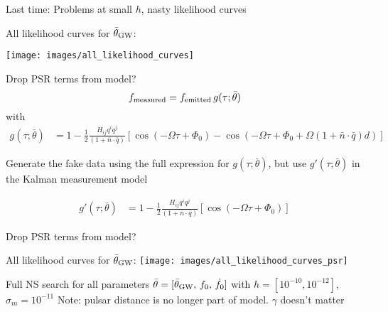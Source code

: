 \documentclass[10pt]{beamer}
\title{}
\subtitle{}
\author{}
\date{EE/GW meeting, May 19, 2023}
\begin{document}
	
	\maketitle
	
	\begin{frame}{}
		
		Last time: Problems at small $h$, nasty likelihood curves
	
	All likelihood curves for $\bar{\theta}_{\rm GW}$:

\texttt{[image: images/all\_likelihood\_curves]}


\end{frame}




\begin{frame}{Drop PSR terms from model?}
	\begin{equation}
		f_{\rm measured} = f_{\rm emitted} \, g(\tau; \bar{\theta})
		\label{eq:measureent}
	\end{equation}
	with
	\begin{align}
		g(\tau; \bar{\theta}) 
		& = 1 - \frac{1}{2} \frac{ H_{ij}q^i q^j }{(1 + \bar{n}\cdot \bar{q}) } \left[ \cos(-\Omega \tau +\Phi_0) - \cos(-\Omega \tau +\Phi_0 + \Omega (1 + \bar{n}\cdot \bar{q})  d) \right]
	\end{align}
	
	Generate the fake data using the full expression for $g(\tau; \bar{\theta})$, but use $g'(\tau; \bar{\theta})$ in the Kalman measurement model
	
	\begin{align}
		g'(\tau; \bar{\theta}) 
		& = 1 - \frac{1}{2} \frac{ H_{ij}q^i q^j }{(1 + \bar{n}\cdot \bar{q}) } \left[ \cos(-\Omega \tau +\Phi_0) \right]
	\end{align}
\end{frame}


\begin{frame}{Drop PSR terms from model?}
	
	All likelihood curves for $\bar{\theta}_{\rm GW}$:
	\texttt{[image: images/all\_likelihood\_curves\_psr]}
	
\end{frame}



\begin{frame}
	Full NS search for \alert{all parameters} \newline 
	$\bar{\theta} = [\bar{\theta}_{\rm GW}, \, f_0, \, \dot{f}_0]$ \newline 
	with $h = [10^{-10}, 10^{-12}]$, $\sigma_m = 10^{-11}$ \newline 
	Note: pulsar distance is no longer part of model. $\gamma$ doesn't matter
	

\end{frame}
\end{document}
